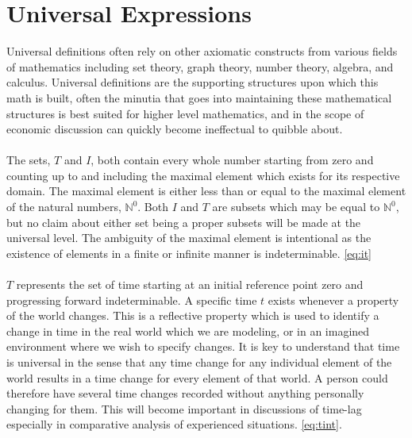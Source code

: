 \documentclass[]{article}
\begin{document}
\section*{Universal Expressions}
 Universal definitions often rely on other axiomatic constructs from various fields of mathematics including set theory, graph theory, number theory, algebra, and calculus. Universal definitions are the supporting structures upon which this math is built, often the minutia that goes into maintaining these mathematical structures is best suited for higher level mathematics, and in the scope of economic discussion can quickly become ineffectual to quibble about. 
\\
\\
The sets, $T$ and $I$, both contain every whole number starting from zero and counting up to and including the maximal element which exists for its respective domain. The maximal element is either less than or equal to the maximal element of the natural numbers, $\mathbb{N}^{0}$. Both $I$ and $T$ are subsets which may be equal to $\mathbb{N}^{0}$, but no claim about either set being a proper subsets will be made at the universal level. The ambiguity of the maximal element is intentional as the existence of elements in a finite or infinite manner is indeterminable. \eqref{eq:it}
\\
\\
$T$ represents the set of time starting at an initial reference point zero and progressing forward indeterminable. A specific time $t$ exists whenever a property of the world changes. This is a reflective property which is used to identify a change in time in the real world which we are modeling, or in an imagined environment where we wish to specify changes. It is key to understand that time is universal in the sense that any time change for any individual element of the world results in a time change for every element of that world. A person could therefore have several time changes recorded without anything personally changing for them. This will become important in discussions of time-lag especially in comparative analysis of experienced situations. \eqref{eq:tint}. 
\end{document}
